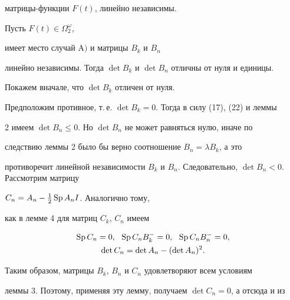 матрицы-функции $F(t)$, линейно независимы. 


 


 


\begin{lem} 


Пусть $F(t)\in\Omega^\omega_2$, 


имеет место случай $\mathrm A)$ и матрицы $B_k$ и $B_n$ 


линейно независимы. Тогда $\det B_k$ и $\det B_n$ отличны от нуля и единицы. 


\end{lem} 


 





\begin{pf} 


Покажем вначале, что $\det B_k$ отличен от нуля. 


Предположим противное, т.\,е. $\det B_k=0$. Тогда в силу (17), (22) и леммы 


2 имеем $\det B_n\le0$. Но $\det B_n$ не может равняться нулю, иначе по 


следствию леммы 2 было бы верно соотношение $B_n=\lambda B_k$, а это 


противоречит линейной независимости $B_k$ и $B_n$. Следовательно, $\det 


B_n<0$. Рассмотрим матрицу\linebreak


$C_n=A_n-\frac{1}{2}\operatorname{Sp} A_n I$. Аналогично тому, 


как в лемме 4 для матриц $C_k$, $C_n$ имеем 




\begin{gather*} 


\Sp C_n=0,\ \ \Sp C_n B^-_k=0,\ \ \Sp C_n B^-_n=0,\\ 


\det C_n=\det A_n-(\det A_n)^2. 


\end{gather*} 


 


Таким образом, матрицы $B_k$, $B_n$ и $C_n$ удовлетворяют всем условиям 


леммы 3. Поэтому, применяя эту лемму, получаем $\det C_n=0$, а отсюда и из 



\end{pf}
